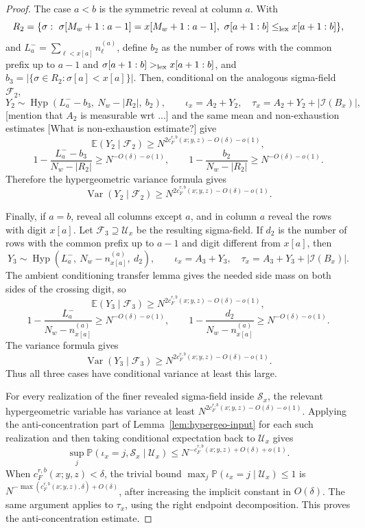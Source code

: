 \documentclass[11pt]{article}
\newcommand{\cI}{\mathcal I}
\newcommand{\E}{\mathbb E}
\newcommand{\Pbb}{\mathbb P}
\newcommand{\jscomment}[1]{\textup{\textsf{\color{blue}[#1]}}}
\begin{document}
\begin{proof}
The case \(a<b\) is the symmetric reveal at column \(a\). With
\[
    R_2=\{\sigma:\ \sigma[M_w+1:a-1]=x[M_w+1:a-1],\
    \sigma[a+1:b]\le_{\rm lex} x[a+1:b]\},
\]
and \(L_a^-=\sum_{\ell<x[a]}n_\ell^{(a)}\), define \(b_2\) as the number
of rows with the common prefix up to \(a-1\) and
\(\sigma[a+1:b]>_{\rm lex}x[a+1:b]\), and
\(b_3=|\{\sigma\in R_2:\sigma[a]<x[a]\}|\).
Then, conditional on the analogous sigma-field \(\mathcal F_2\),
\[
    Y_2\sim\operatorname{Hyp}(L_a^- - b_3,\ N_w-|R_2|,\ b_2),
    \qquad
    \iota_x=A_2+Y_2,\quad
    \tau_x=A_2+Y_2+|\cI(B_x)|,
\]
\jscomment{mention that $A_2$ is measurable wrt ...}
and the same mean and non-exhaustion estimates \jscomment{What is non-exhaustion estimate?} give
\[
    \E(Y_2\mid\mathcal F_2)\ge N^{2c_F^{r,b}(x;y,z)-O(\delta)-o(1)},
\]
\[
    1-\frac{L_a^- -b_3}{N_w-|R_2|}
    \ge N^{-O(\delta)-o(1)},\qquad
    1-\frac{b_2}{N_w-|R_2|}
    \ge N^{-O(\delta)-o(1)}.
\]
Therefore the hypergeometric variance formula gives
\[
    \operatorname{Var}(Y_2\mid\mathcal F_2)
    \ge N^{2c_F^{r,b}(x;y,z)-O(\delta)-o(1)}.
\]

Finally, if \(a=b\), reveal all columns except \(a\), and in column \(a\)
reveal the rows with digit \(x[a]\). Let \(\mathcal F_3\supseteq
\mathcal U_x\) be the resulting sigma-field. If \(d_2\) is the number of
rows with the common prefix up to \(a-1\) and digit different from
\(x[a]\), then
\[
    Y_3\sim
    \operatorname{Hyp}(L_a^-,\ N_w-n_{x[a]}^{(a)},\ d_2),
    \qquad
    \iota_x=A_3+Y_3,\quad
    \tau_x=A_3+Y_3+|\cI(B_x)|.
\]
The ambient conditioning transfer lemma gives the needed side mass on both
sides of the crossing digit, so
\[
    \E(Y_3\mid\mathcal F_3)\ge N^{2c_F^{r,b}(x;y,z)-O(\delta)-o(1)},
\]
\[
    1-\frac{L_a^-}{N_w-n_{x[a]}^{(a)}}\ge N^{-O(\delta)-o(1)},
    \qquad
    1-\frac{d_2}{N_w-n_{x[a]}^{(a)}}\ge N^{-O(\delta)-o(1)}.
\]
The variance formula gives
\[
    \operatorname{Var}(Y_3\mid\mathcal F_3)
    \ge N^{2c_F^{r,b}(x;y,z)-O(\delta)-o(1)}.
\]
Thus all three cases have conditional variance at least this large.

For every realization of the finer revealed sigma-field inside
\(\mathcal S_x\), the relevant hypergeometric variable has variance at
least \(N^{2c_F^{r,b}(x;y,z)-O(\delta)-o(1)}\). Applying the
anti-concentration part of Lemma~\ref{lem:hypergeo-input} for each such
realization and then taking conditional expectation back to
\(\mathcal U_x\) gives
\[
    \sup_j\Pbb(\iota_x=j,\mathcal S_x\mid\mathcal U_x)
    \le
    N^{-c_F^{r,b}(x;y,z)+O(\delta)+o(1)}.
\]
When \(c_F^{r,b}(x;y,z)<\delta\), the trivial bound
\(\max_j\Pbb(\iota_x=j\mid\mathcal U_x)\le1\) is
\(N^{-\max(c_F^{r,b}(x;y,z),\delta)+O(\delta)}\), after increasing the
implicit constant in \(O(\delta)\). The same argument applies to
\(\tau_x\), using the right endpoint decomposition. This proves the
anti-concentration estimate.
\end{proof}
\end{document}
